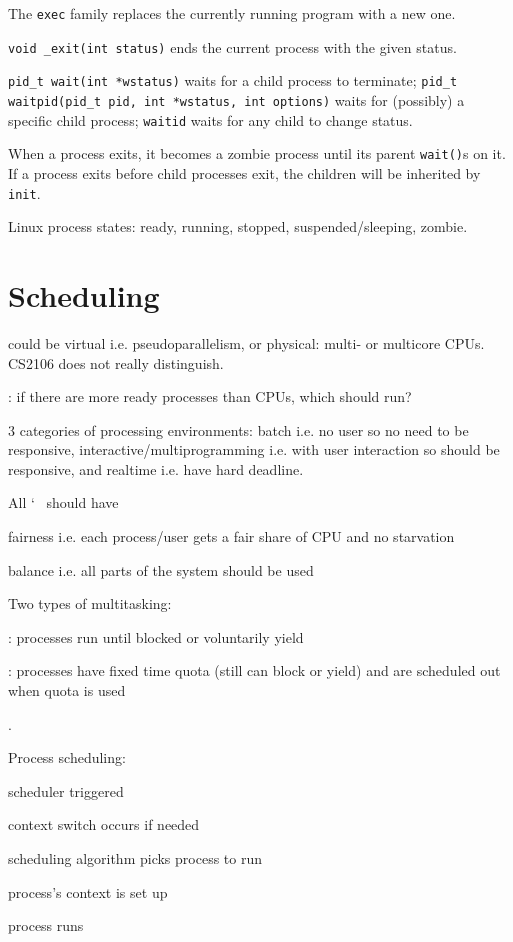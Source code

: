 \documentclass[fontsize=9pt]{slnotes}
\newcommand\sltilde{\char`~}
\begin{document}
The \texttt{exec} family replaces the currently running program with a new one.

\texttt{void \_exit(int status)} ends the current process with the given status.

\texttt{pid\_t wait(int *wstatus)} waits for a child process to terminate; \texttt{pid\_t waitpid(pid\_t pid, int *wstatus, int options)} waits for (possibly) a specific child process; \texttt{waitid} waits for any child to change status.

When a process exits, it becomes a zombie process until its parent \texttt{wait()}s on it. If a process exits before child processes exit, the children will be inherited by \texttt{init}.

Linux process states: ready, running, stopped, suspended/sleeping, zombie.

\chapter{Scheduling}
 could be virtual i.e. pseudoparallelism, or physical: multi- or multicore CPUs. CS2106 does not really distinguish.

: if there are more ready processes than CPUs, which should run?

3 categories of processing environments: batch i.e. no user so no need to be responsive, interactive/multiprogramming i.e. with user interaction so should be responsive, and realtime i.e. have hard deadline.

All \sltilde{} should have \begin{slinenum}
\item fairness i.e. each process/user gets a fair share of CPU and no starvation
\item balance i.e. all parts of the system should be used
\end{slinenum}

Two types of multitasking: \begin{slinenum}
\item {}: processes run until blocked or voluntarily yield
\item {}: processes have fixed time quota (still can block or yield) and are scheduled out when quota is used
\end{slinenum}.

Process scheduling: \begin{slinenumthen}
\item scheduler triggered
\item context switch occurs if needed
\item scheduling algorithm picks process to run
\item process's context is set up
\item process runs
\end{slinenumthen}
\end{document}
